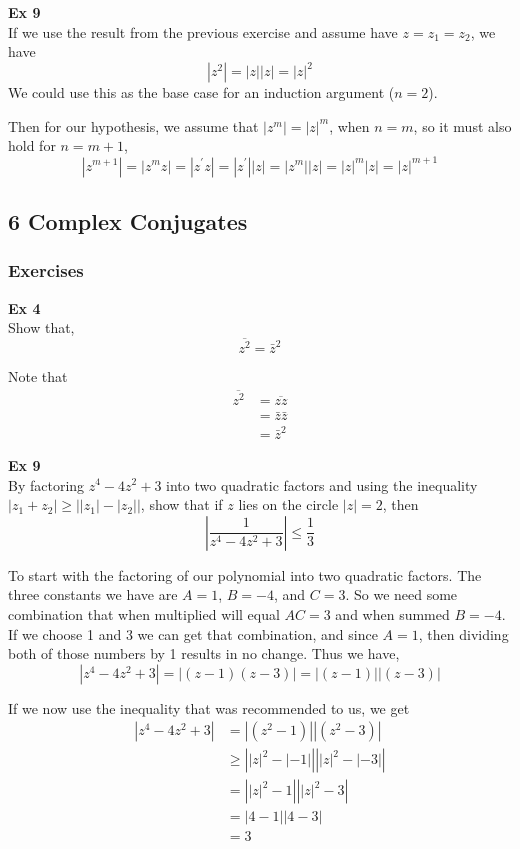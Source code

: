 \textbf{Ex 9}
\\
If we use the result from the previous exercise and assume have $z = z_1 = z_2$, we have
$$
|z^2| = |z||z| = |z|^2
$$
We could use this as the base case for an induction argument ($n=2$).

Then for our hypothesis, we assume that $|z^m| = |z|^m$, when $n=m$, so it must also
hold for $n=m+1$,
$$
|z^{m+1}| = |z^m z| = |z^\prime z| = |z^\prime| |z| = |z^m| |z| = |z|^m |z| = |z|^{m+1}
$$

\subsection{6 Complex Conjugates}

\subsubsection{Exercises}

\textbf{Ex 4}
\\
Show that,
$$
\overline{z^2} = \bar{z}^2
$$

Note that
\begin{align*}
\overline{z^2} &= \overline{z z} \\
    &= \bar{z} \bar{z} \\
    &= \bar{z}^2
\end{align*}


\textbf{Ex 9}
\\
By factoring $z^4 -4z^2 + 3$ into two quadratic factors and using the inequality $|z_1 + z_2| \geq \left| |z_1| - |z_2| \right|$,
show that if $z$ lies on the circle $|z| = 2$, then
$$
\left| \frac{1}{z^4 - 4z^2 + 3} \right| \leq \frac{1}{3}
$$

To start with the factoring of our polynomial into two quadratic factors.
The three constants we have are $A=1$, $B=-4$, and $C=3$.
So we need some combination that when multiplied will equal $AC = 3$ and when summed $B=-4$.
If we choose 1 and 3 we can get that combination, and since $A=1$, then dividing both of those numbers by 1 results in no change.
Thus we have,
$$
\left| z^4 - 4z^2 + 3 \right| = \left| \left(z-1\right) \left(z-3\right) \right| =
\left| \left(z-1\right) \right| \left| \left(z-3\right) \right|
$$

If we now use the inequality that was recommended to us, we get
\begin{align*}
\left| z^4 - 4z^2 + 3 \right| &= \left| \left(z^2 - 1\right) \right| \left| \left(z^2 - 3\right) \right| \\
&\geq \left| |z|^2 - |-1| \right| \left| |z|^2 - |-3| \right| \\
&= \left| |z|^2 - 1 \right| \left| |z|^2 -3 \right| \\
&= \left| 4-1 \right| \left| 4-3 \right| \\
&= 3
\end{align*}

